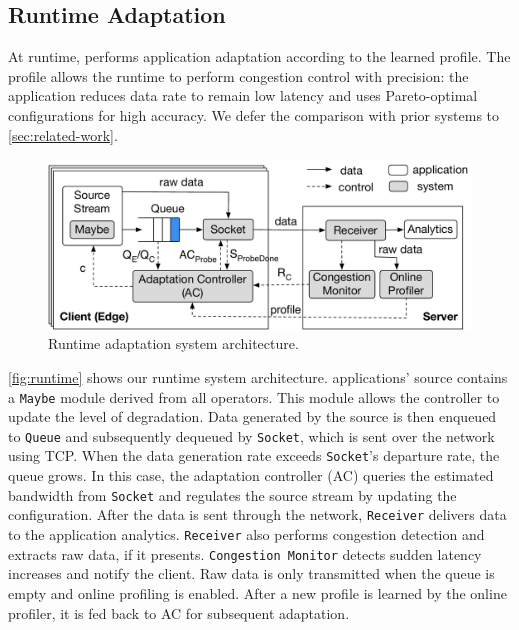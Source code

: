 \subsection{Runtime Adaptation}
\label{sec:runtime}

At runtime, \sysname{} performs application adaptation according to the learned
profile. The profile allows the runtime to perform congestion control with
precision: the application reduces data rate to remain low latency and uses
Pareto-optimal configurations for high accuracy. We defer the comparison with
prior systems to \autoref{sec:related-work}.

\begin{figure}
  \centering
  \includegraphics[width=\linewidth]{figures/runtime-adaptation.pdf}
  \caption{Runtime adaptation system architecture.}
  \label{fig:runtime}
\end{figure}

\autoref{fig:runtime} shows our runtime system architecture. \sysname{}
applications' source contains a \texttt{Maybe} module derived from all \maybe{}
operators. This module allows the controller to update the level of
degradation. Data generated by the source is then enqueued to \texttt{Queue} and
subsequently dequeued by \texttt{Socket}, which is sent over the network using
TCP. When the data generation rate exceeds \texttt{Socket}'s departure rate, the
queue grows. In this case, the adaptation controller (AC) queries the estimated
bandwidth from \texttt{Socket} and regulates the source stream by updating the
configuration. After the data is sent through the network, \texttt{Receiver}
delivers data to the application analytics. \texttt{Receiver} also performs
congestion detection and extracts raw data, if it presents.  \texttt{Congestion
  Monitor} detects sudden latency increases and notify the client. Raw data is
only transmitted when the queue is empty and online profiling is enabled. After
a new profile is learned by the online profiler, it is fed back to AC for
subsequent adaptation.


